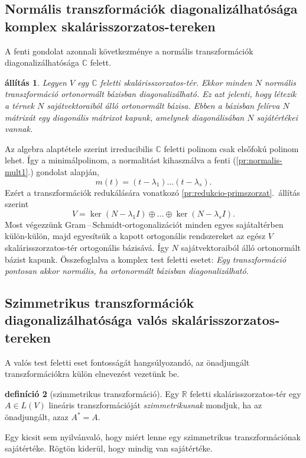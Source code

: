 \documentclass[a4paper, showtrims]{memoir}
\makeatletter
\renewenvironment{proof}[1][\proofname]
    {\par\pushQED{\qed}%
    \normalfont \topsep6\p@\@plus6\p@\relax
    \trivlist
    \item[\hskip\labelsep
        \itshape
    #1\@addpunct{:}]\ignorespaces}
    {\popQED\endtrivlist\@endpefalse}
\theoremstyle{plain}
\newtheorem{proposition}{állítás}[chapter]
\theoremstyle{remark}
\theoremstyle{definition}
\newtheorem{definition}[proposition]{definíció}
\makeatother
\begin{document}
\subsection{Normális transzformációk diagonalizálhatósága komplex skalárisszorzatos-tereken}
A fenti gondolat azonnali következménye a normális transzformációk diagonalizálhatósága $\mathbb{C}$ felett.
\begin{proposition}
	Legyen $V$ egy $\mathbb{C}$ feletti skalárisszorzatos-tér.
	Ekkor minden $N$ normális transzformáció ortonormált bázisban diagonalizálható.
	Ez azt jelenti, hogy létezik a térnek $N$ sajátvektoraiból álló ortonormált bázisa.
	Ebben a bázisban felírva $N$ mátrixát egy diagonális mátrixot kapunk,
	amelynek diagonálisában $N$ sajátértékei vannak.
\end{proposition}
\begin{proof}
	Az algebra alaptétele szerint irreducibilis $\mathbb{C}$ feletti polinom
	csak elsőfokú polinom lehet.
	Így a minimálpolinom, a normalitást kihasználva a fenti (\ref{pr:normalis-mult1}.) gondolat alapján,
	\[
		m\left( t \right)=\left( t-\lambda_1 \right)\dots\left( t-\lambda_s \right).
	\]
	Ezért a transzformációk redukálására vonatkozó \ref{pr:redukcio-primszorzat}.~állítás szerint
	\[
		V=\ker\left( N-\lambda_1I \right)\oplus\dots\oplus\ker\left( N-\lambda_sI \right).
	\]
	Most végezzünk Gram\,--\,Schmidt-ortogonalizációt
	minden egyes sajátaltérben külön-külön,
	majd egyesítsük a kapott ortogonális rendszereket az egész $V$ skalárisszorzatos-tér ortogonális bázisává.
	Így $N$ sajátvektoraiból álló ortonormált bázist kapunk.
\end{proof}
Összefoglalva a komplex test feletti esetet:
\emph{
	Egy transzformáció pontosan akkor normális,
	ha ortonormált bázisban diagonalizálható.
}

\subsection{Szimmetrikus transzformációk diagonalizálhatósága valós skalárisszorzatos-tereken}
A valós test feletti eset fontosságát hangsúlyozandó,
az önadjungált transzformációkra külön elnevezést vezetünk be.
\begin{definition}[szimmetrikus transzformáció]
	Egy $\mathbb{R}$ feletti skalárisszorzatos-tér egy $A\in L\left( V \right)$ lineáris transzformációját
	\emph{szimmetrikusnak} mondjuk, ha az önadjungált, azaz  $A^\ast=A$.
\end{definition}
Egy kicsit sem nyilvánvaló, hogy miért lenne egy szimmetrikus transzformációnak sajátértéke.
Rögtön kiderül, hogy mindig van sajátértéke.
\end{document}
